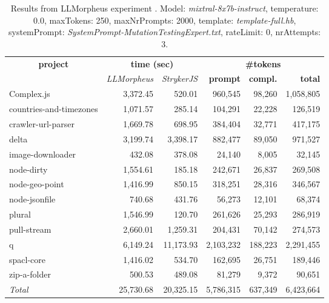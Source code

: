 
\begin{table*}[hbt!]
\centering
{\scriptsize
\begin{tabular}{l||r|r|r|r|r}
\multicolumn{1}{c|}{\bf project} & \multicolumn{2}{|c|}{\bf time (sec)} & \multicolumn{3}{|c|}{\bf \#tokens} \\
               & {\it LLMorpheus} & {\it StrykerJS} & {\bf prompt} & {\bf compl.} & {\bf total} \\
\hline
  Complex.js & 3,372.45 & 520.01 & 960,545 & 98,260 & 1,058,805 \\ 
countries-and-timezones & 1,071.57 & 285.14 & 104,291 & 22,228 & 126,519 \\ 
crawler-url-parser & 1,669.78 & 698.95 & 384,404 & 32,771 & 417,175 \\ 
delta & 3,199.74 & 3,398.17 & 882,477 & 89,050 & 971,527 \\ 
image-downloader & 432.08 & 378.08 & 24,140 & 8,005 & 32,145 \\ 
node-dirty & 1,554.61 & 185.18 & 242,671 & 26,837 & 269,508 \\ 
node-geo-point & 1,416.99 & 850.15 & 318,251 & 28,316 & 346,567 \\ 
node-jsonfile & 740.68 & 431.76 & 56,273 & 12,101 & 68,374 \\ 
plural & 1,546.99 & 120.70 & 261,626 & 25,293 & 286,919 \\ 
pull-stream & 2,660.01 & 1,259.31 & 204,431 & 70,142 & 274,573 \\ 
q & 6,149.24 & 11,173.93 & 2,103,232 & 188,223 & 2,291,455 \\ 
spacl-core & 1,416.02 & 534.70 & 162,695 & 26,751 & 189,446 \\ 
zip-a-folder & 500.53 & 489.08 & 81,279 & 9,372 & 90,651 \\ 
\hline
  \textit{Total} & 25,730.68 & 20,325.15 & 5,786,315 & 637,349 & 6,423,664 \\
  \end{tabular}
  }
  \\[2mm]
  \caption{Results from LLMorpheus experiment .
    Model: \textit{mixtral-8x7b-instruct}, 
    temperature: 0.0, 
    maxTokens: 250, 
    maxNrPrompts: 2000, 
    template: \textit{template-full.hb}, 
    systemPrompt: \textit{SystemPrompt-MutationTestingExpert.txt}, 
    rateLimit: 0, 
    nrAttempts: 3.  
  }
  \label{table:Cost:run361:mixtral-8x7b-instruct:template-full.hb:0.0}
\end{table*}